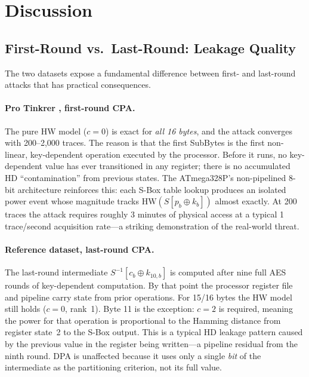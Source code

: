 \section{Discussion}
\label{sec:discussion}

\subsection{First-Round vs.\ Last-Round: Leakage Quality}
\label{sec:discussion:roundcomp}

The two datasets expose a fundamental difference between first- and
last-round attacks that has practical consequences.

\paragraph{Pro Tinkrer , first-round CPA.}
The pure HW model ($c=0$) is exact for \emph{all 16 bytes}, and the attack
converges with 200--2{,}000 traces.
The reason is that the first SubBytes is the first non-linear, key-dependent
operation executed by the processor.
Before it runs, no key-dependent value has ever transitioned in any register;
there is no accumulated HD ``contamination'' from previous states.
The ATmega328P's non-pipelined 8-bit architecture reinforces this: each
S-Box table lookup produces an isolated power event whose magnitude tracks
$\mathrm{HW}(S[p_b \oplus k_b])$ almost exactly.
At 200 traces the attack requires roughly 3 minutes of physical access
at a typical 1 trace/second acquisition rate---a striking demonstration
of the real-world threat.

\paragraph{Reference dataset, last-round CPA.}
The last-round intermediate $S^{-1}[c_b \oplus k_{10,b}]$ is computed
after nine full AES rounds of key-dependent computation.
By that point the processor register file and pipeline carry state from
prior operations.
For 15/16 bytes the HW model still holds ($c=0$, rank~1).
Byte 11 is the exception: $c=2$ is required, meaning the power for that
operation is proportional to the Hamming distance from register state~2
to the S-Box output.
This is a typical HD leakage pattern caused by the previous value in
the register being written---a pipeline residual from the ninth round.
DPA is unaffected because it uses only a single \emph{bit} of the
intermediate as the partitioning criterion, not its full value.

